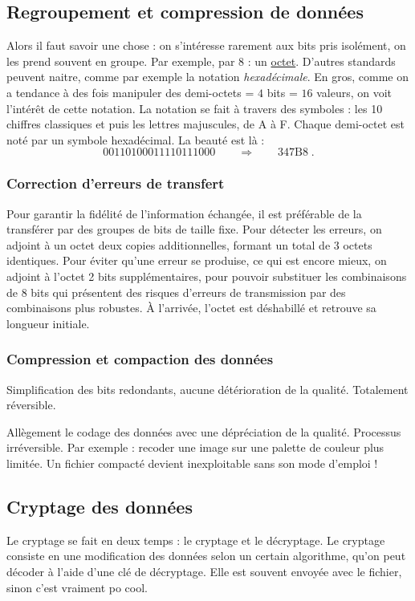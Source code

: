 \documentclass[12pt,a4paper]{report}
\begin{document}
\subsection{Regroupement et compression de données}
Alors il faut savoir une chose : on s'intéresse rarement aux bits pris isolément, on les prend souvent en groupe. Par exemple, par 8 : un \underline{octet}. D'autres standards peuvent naitre, comme par exemple la notation \textit{hexadécimale}. En gros, comme on a tendance à des fois manipuler des demi-octets = $4$ bits = $16$ valeurs, on voit l'intérêt de cette notation. La notation se fait à travers des symboles : les 10 chiffres classiques et puis les lettres majuscules, de A à F. Chaque demi-octet est noté par un symbole hexadécimal. La beauté est là :
$$00110100011110111000 \qquad \Longrightarrow \qquad \text{347B8}\; .$$

\subsubsection{Correction d'erreurs de transfert}
Pour garantir la fidélité de l'information échangée, il est préférable de la transférer par des groupes de bits de taille fixe. Pour détecter les erreurs, on adjoint à un octet deux copies additionnelles, formant un total de 3 octets identiques. Pour éviter qu'une erreur se produise, ce qui est encore mieux, on adjoint à l'octet 2 bits supplémentaires, pour pouvoir substituer les combinaisons de 8 bits qui présentent des risques d'erreurs de transmission par des combinaisons plus robustes. À l'arrivée, l'octet est déshabillé et retrouve sa longueur initiale.
\subsubsection{Compression et compaction des données}
\begin{description}[leftmargin=!,labelwidth=\widthof{\bfseries Compression b}]
\item[Compression] Simplification des bits redondants, aucune détérioration de la qualité. Totalement réversible.
\item[Compactage] Allègement le codage des données avec une dépréciation de la qualité. Processus irréversible. Par exemple : recoder une image sur une palette de couleur plus limitée. Un fichier compacté devient inexploitable sans son mode d'emploi !
\end{description}
\subsection{Cryptage des données}
Le cryptage se fait en deux temps : le cryptage et le décryptage. Le cryptage consiste en une modification des données selon un certain algorithme, qu'on peut décoder à l'aide d'une clé de décryptage. Elle est souvent envoyée avec le fichier, sinon c'est vraiment po cool.
\end{document}
